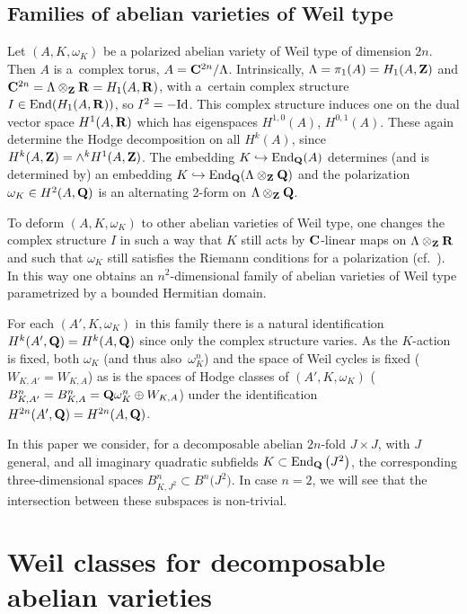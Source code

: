 \documentclass[pdftex]{sigma}
\numberwithin{equation}{section}
\begin{document}
\subsection{Families of abelian varieties of Weil type}\label{famwt}
Let $(A,K,\omega_K)$ be a polarized abelian variety of Weil type of dimension $2n$.
Then $A$ is a~complex torus, $A={\bf C}^{2n}/\Lambda$.
Intrinsically, $\Lambda=\pi_1(A)=H_1(A,{\bf Z})$ and ${\bf C}^{2n}=\Lambda\otimes_{\bf Z}{\bf R}=H_1(A,{\bf R})$,
with a~certain complex structure $I\in \operatorname{End}(H_1(A,{\bf R}))$, so $I^2=-{\rm Id}$.
This complex structure induces one on the dual vector space $H^1(A,{\bf R})$ which has eigenspaces
$H^{1,0}(A)$, $H^{0,1}(A)$. These again determine the Hodge decomposition on all $H^k(A)$,
since $H^k(A,{\bf Z})=\wedge^kH^1(A,{\bf Z})$.
The embedding $K\hookrightarrow \operatorname{End}_{\bf Q}(A)$ determines (and is determined by)
an embedding ${K\hookrightarrow \operatorname{End}_{\bf Q}(\Lambda\otimes_{\bf Z}{\bf Q})}$ and the polarization
$\omega_K\in H^2(A,{\bf Q})$ is an alternating 2-form on $\Lambda\otimes_{\bf Z}{\bf Q}$.

To deform $(A,K,\omega_K)$ to other abelian varieties of Weil type, one changes the complex
structure $I$ in such a way that $K$ still acts by ${\bf C}$-linear maps on $\Lambda\otimes_{\bf Z}{\bf R}$
and such that $\omega_K$ still satisfies the Riemann conditions for a polarization
(cf.\ \cite[Section 5]{hcav}). In this way one obtains
an $n^2$-dimensional family of abelian varieties of Weil type parametrized by
a bounded Hermitian domain.

For each $(A',K,\omega_K)$ in this family there is a natural identification
$H^k(A',{\bf Q})=H^k(A,{\bf Q})$ since only the complex structure varies.
As the $K$-action is fixed, both $\omega_K$
(and thus also~$\omega_K^n$) and the space of Weil cycles is fixed
($W_{K,A'}=W_{K,A}$) as is the spaces of Hodge classes of $(A',K,\omega_K)$
($B^n_{K,A'}=B^n_{K,A}={\bf Q}\omega_K^n\oplus W_{K,A}$)
under the identification $H^{2n}(A',{\bf Q})=H^{2n}(A,{\bf Q})$.

In this paper we consider, for a decomposable abelian $2n$-fold $J\times J$, with $J$ general,
and all imaginary quadratic subfields $K\subset \operatorname{End}_{\bf Q}\big(J^2\big)$, the corresponding
three-dimensional spaces $B^n_{K,J^2}\subset B^n\big(J^2\big)$. In case $n=2$, we will see that the
intersection between these subspaces is non-trivial.

\section{Weil classes for decomposable abelian varieties}\label{decaf}
\end{document}
